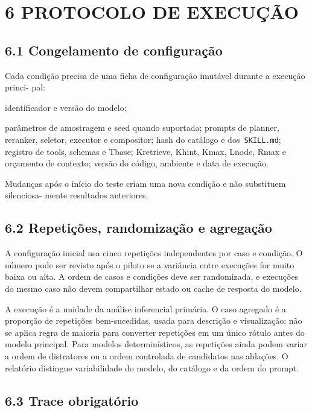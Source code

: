 \documentclass[12pt,a4paper]{article}
\begin{document}
\section*{6 PROTOCOLO DE EXECUÇÃO}

\subsection*{6.1 Congelamento de configuração}

Cada condição precisa de uma ficha de configuração imutável durante a execução princi- pal:


\noindent \textbullet{} identificador e versão do modelo;\par


\noindent \textbullet{} parâmetros de amostragem e seed quando suportada; \textbullet{} prompts de planner, reranker, seletor, executor e compositor; \textbullet{} hash do catálogo e dos\texttt{ SKILL.md}; \textbullet{} registro de tools, schemas e Tbase; \textbullet{} Kretrieve, Khint, Kmax, Lnode, Rmax e orçamento de contexto; \textbullet{} versão do código, ambiente e data de execução.\par

Mudanças após o início do teste criam uma nova condição e não substituem silenciosa- mente resultados anteriores.


\subsection*{6.2 Repetições, randomização e agregação}

A configuração inicial usa cinco repetições independentes por caso e condição. O número pode ser revisto após o piloto se a variância entre execuções for muito baixa ou alta. A ordem de casos e condições deve ser randomizada, e execuções do mesmo caso não devem compartilhar estado ou cache de resposta do modelo.


A execução é a unidade da análise inferencial primária. O caso agregado é a proporção de repetições bem-sucedidas, usada para descrição e visualização; não se aplica regra de maioria para converter repetições em um único rótulo antes do modelo principal. Para modelos determinísticos, as repetições ainda podem variar a ordem de distratores ou a ordem controlada de candidatos nas ablações. O relatório distingue variabilidade do modelo, do catálogo e da ordem do prompt.


\subsection*{6.3 Trace obrigatório}
\end{document}
